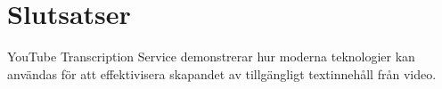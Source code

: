 \chapter{Slutsatser}
YouTube Transcription Service demonstrerar hur moderna teknologier kan användas för att effektivisera skapandet av tillgängligt textinnehåll från video.
